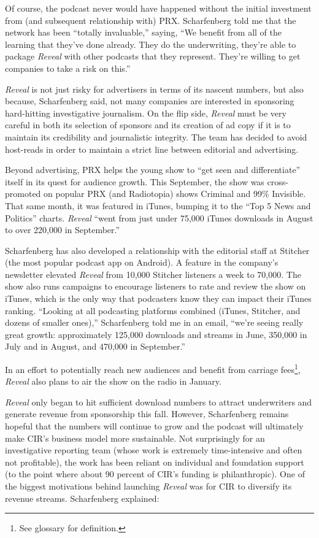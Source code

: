 \documentclass[notoc, symmetric, nobib, nols]{towcenter-guideto-book}
\begin{document}
Of course, the podcast never would have happened without the initial investment from (and subsequent relationship with) PRX. Scharfenberg told me that the network has been ``totally invaluable,'' saying, ``We benefit from all of the learning that they've done already. They do the underwriting, they're able to package \textit{Reveal} with other podcasts that they represent. They're willing to get companies to take a risk on this.''\autocite{reveal} 

\textit{Reveal} is not just risky for advertisers in terms of its nascent numbers, but also because, Scharfenberg said, not many companies are interested in sponsoring hard-hitting investigative journalism. On the flip side, \textit{Reveal} must be very careful in both its selection of sponsors and its creation of ad copy if it is to maintain its credibility and journalistic integrity. The team has decided to avoid host-reads in order to maintain a strict line between editorial and advertising.\autocite{reveal}

Beyond advertising, PRX helps the young show to ``get seen and differentiate'' itself in its quest for audience growth.\autocite{reveal} This September, the show was cross-promoted on popular PRX (and Radiotopia) shows Criminal and 99\% Invisible. That same month, it was featured in iTunes, bumping it to the ``Top 5 News and Politics'' charts. \textit{Reveal} ``went from just under 75,000 iTunes downloads in August to over 220,000 in September.''\autocite{christa} 

Scharfenberg has also developed a relationship with the editorial staff at Stitcher (the most popular podcast app on Android). A feature in the company's newsletter elevated \textit{Reveal} from 10,000 Stitcher listeners a week to 70,000. The show also runs campaigns to encourage listeners to rate and review the show on iTunes, which is the only way that podcasters know they can impact their iTunes ranking.\autocite{reveal} ``Looking at all podcasting platforms combined (iTunes, Stitcher, and dozens of smaller ones),'' Scharfenberg told me in an email, ``we're seeing really great growth: approximately 125,000 downloads and streams in June, 350,000 in July and in August, and 470,000 in September.''\autocite{christa}

In an effort to potentially reach new audiences and benefit from carriage fees\footnote{See glossary for definition.}, \textit{Reveal} also plans to air the show on the radio in January.\autocite{reveal}

\textit{Reveal} only began to hit sufficient download numbers to attract underwriters and generate revenue from sponsorship this fall. However, Scharfenberg remains hopeful that the numbers will continue to grow and the podcast will ultimately make CIR's business model more sustainable. Not surprisingly for an investigative reporting team (whose work is extremely time-intensive and often not profitable), the work has been reliant on individual and foundation support (to the point where about 90 percent of CIR's funding is philanthropic). One of the biggest motivations behind launching \textit{Reveal} was for CIR to diversify its revenue streams.\autocite{reveal} Scharfenberg explained: 
\end{document}
